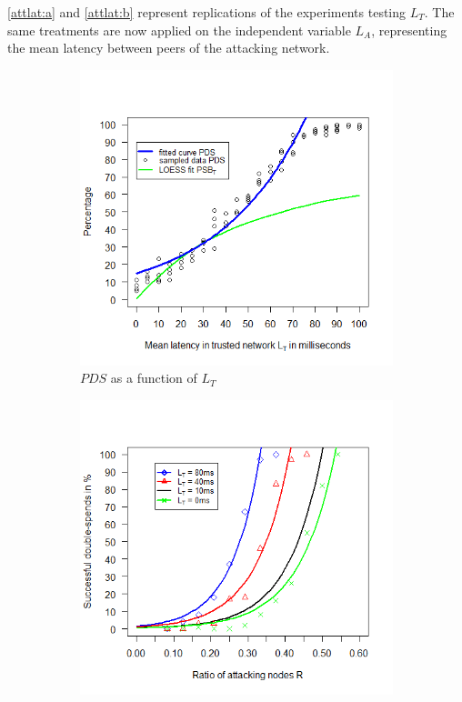 \documentclass[a4paper,12pt,twoside]{report}
\begin{document}
\autoref{attlat:a} and \autoref{attlat:b} represent replications of the experiments testing $L_T$. The same treatments are now applied on the independent variable $L_A$, representing the mean latency between peers of the attacking network.
\begin{figure}[!ht]
\centering
\begin{subfigure}{.5\textwidth}
  \centering
  \includegraphics[width=\linewidth]{Experiments/TruLatency/trulat.png}
  \caption{$PDS$ as a function of $L_{T}$}
  \label{trulat:a}
\end{subfigure}%
\begin{subfigure}{.5\textwidth}
  \centering
  \includegraphics[width=\linewidth]{Experiments/TruLatency/trurat.png}

\end{subfigure}
\end{figure}
\end{document}
